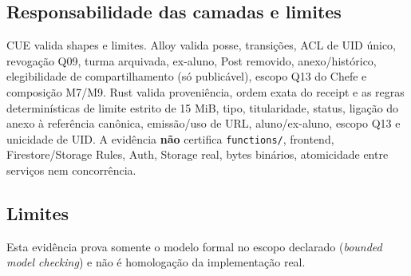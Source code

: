 \subsection*{Responsabilidade das camadas e limites}
CUE valida shapes e limites. Alloy valida posse, transições, ACL de UID único,
revogação Q09, turma arquivada, ex-aluno, Post removido, anexo/histórico,
elegibilidade de compartilhamento (só publicável), escopo Q13 do Chefe e
composição M7/M9. Rust valida proveniência, ordem exata do receipt e as regras
determinísticas de limite estrito de 15 MiB, tipo, titularidade, status,
ligação do anexo à referência canônica, emissão/uso de URL, aluno/ex-aluno,
escopo Q13 e unicidade de UID. A evidência \textbf{não} certifica \texttt{functions/},
frontend, Firestore/Storage Rules, Auth, Storage real, bytes binários,
atomicidade entre serviços nem concorrência.

\begingroup\small\raggedright


\par\endgroup

\subsection*{Limites}
Esta evidência prova somente o modelo formal no escopo declarado
(\textit{bounded model checking}) e não é homologação da implementação real.
\fussy

